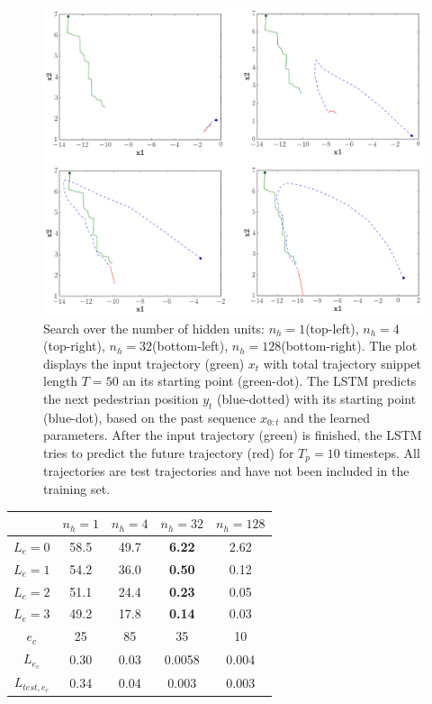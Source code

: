 \begin{figure}
	\centering
	\includegraphics [trim=0 0 0 0, clip, angle=0, width=1.0\columnwidth,
	keepaspectratio]{figures/rnn_real_ped}
	\caption{Search over the number of hidden units: $n_h=1$(top-left), $n_h=4$(top-right), $n_h=32$(bottom-left), $n_h=128$(bottom-right). The plot displays the input trajectory (green) $x_t$ with total trajectory snippet length $T=50$ an its starting point (green-dot). The LSTM predicts the next pedestrian position $y_t$ (blue-dotted) with its starting point (blue-dot), based on the past sequence $x_{0:t}$ and the learned parameters. After the input trajectory (green) is finished, the LSTM tries to predict the future trajectory (red) for $T_p=10$ timesteps. All trajectories are test trajectories and have not been included in the training set.}
	\label{fig:rnn_real_ped}
\end{figure}

\begin{table}[]
\centering
\begin{tabular}{ c| c| c| c| c}
& $n_h=1$ & $n_h=4$ &$n_h=32$ & $n_h=128$\\
\hline
$L_e=0$ & 58.5 & 49.7  & \textbf{6.22} & 2.62      \\
$L_e=1$ & 54.2 & 36.0  & \textbf{0.50} & 0.12      \\
$L_e=2$ & 51.1 & 24.4  & \textbf{0.23} & 0.05      \\
$L_e=3$ & 49.2 & 17.8  & \textbf{0.14} & 0.03      \\
\hline
$e_c$ 			& 25 	& 85 	& 35	& 10 		\\
$L_{e_c}$		&  0.30	& 0.03	& 0.0058& 0.004 	\\
$L_{test, e_c}$	& 0.34	& 0.04	&0.003	& 0.003 	\\     
\end{tabular}
\end{table}

